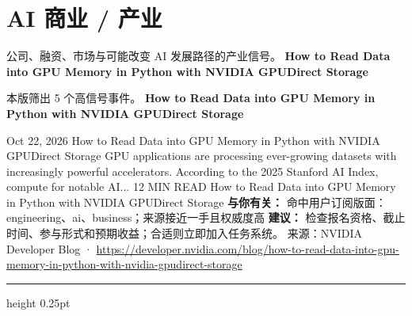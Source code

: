 \documentclass[10.5pt]{ctexart}
\begin{document}
\section*{AI 商业 / 产业}
{\color{ormuted} 公司、融资、市场与可能改变 AI 发展路径的产业信号。}
\vspace{2mm}
{\LARGE\bfseries How to Read Data into GPU Memory in Python with NVIDIA GPUDirect Storage}\par
\vspace{1mm}
{\color{ormuted} 本版筛出 5 个高信号事件。}
\vspace{3mm}
{\Large\bfseries How to Read Data into GPU Memory in Python with NVIDIA GPUDirect Storage}\par
Oct 22, 2026 How to Read Data into GPU Memory in Python with NVIDIA GPUDirect Storage GPU applications are processing ever-growing datasets with increasingly powerful accelerators. According to the 2025 Stanford AI Index, compute for notable AI... 12 MIN READ How to Read Data into GPU Memory in Python with NVIDIA GPUDirect Storage
\textbf{与你有关：} 命中用户订阅版面：engineering、ai、business；来源接近一手且权威度高
\textbf{建议：} 检查报名资格、截止时间、参与形式和预期收益；合适则立即加入任务系统。
{\footnotesize\color{ormuted} 来源：NVIDIA Developer Blog · \url{https://developer.nvidia.com/blog/how-to-read-data-into-gpu-memory-in-python-with-nvidia-gpudirect-storage}}
\vspace{4mm}
\hrule height 0.25pt
\vspace{3mm}
\end{document}
